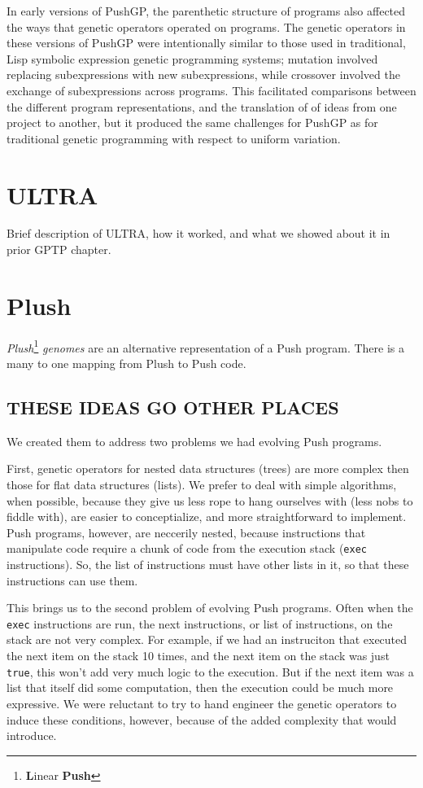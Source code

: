 In early versions of PushGP, the parenthetic structure of programs also affected the ways that  genetic
operators operated on programs. The genetic operators in these versions of PushGP were intentionally similar to those used in traditional, Lisp symbolic expression genetic programming systems; mutation involved replacing subexpressions with new subexpressions, while crossover involved the exchange of subexpressions across programs. This facilitated comparisons between the different program representations, and the translation of of ideas from one project to another, but it produced the same challenges for PushGP as for traditional genetic programming with respect to uniform variation.

\section{ULTRA}

Brief description of ULTRA, how it worked, and what we showed about it in prior GPTP chapter.

\section{Plush}
\textit{Plush}\footnote{\textbf{L}inear \textbf{Push}} \textit{genomes} are
an alternative representation of a Push program. There is a many to one mapping
from Plush to Push code.

\subsection{THESE IDEAS GO OTHER PLACES}
We created them to address two problems we had evolving Push programs.

First, genetic operators for nested data structures (trees) are more complex
then those for flat data structures (lists). We prefer to deal with simple
algorithms, when possible, because they give us less rope to hang ourselves with
(less nobs to fiddle with), are easier to conceptialize, and more straightforward
to implement. Push programs, however, are neccerily nested, because instructions
that manipulate code require a chunk of code from
the execution stack (\texttt{exec} instructions). So, the
list of instructions must have other lists in it, so that these instructions
can use them.

This brings us to the second problem of evolving Push programs. Often when the
\texttt{exec} instructions are run, the next instructions, or list of
instructions, on the stack are not very complex. For example, if we had an
instruciton that executed the next item on the stack 10 times, and the next
item on the stack was just \texttt{true}, this won't add very much logic to the
execution. But if the next item was a list that itself did some computation,
then the execution could be much more expressive. We were reluctant to try to
hand engineer the genetic operators to induce these conditions, however,
because of the added complexity that would introduce.

